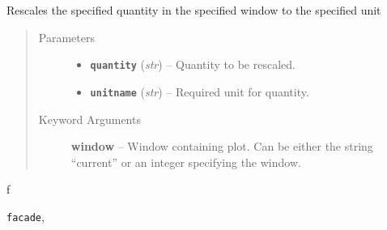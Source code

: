 \documentclass[letterpaper,10pt,english]{sphinxmanual}
\begin{document}

\begin{fulllineitems}
\label{index:facade.rescale}
Rescales the specified quantity in the specified window to the specified unit
\begin{quote}\begin{description}
\item[{Parameters}] \leavevmode\begin{itemize}
\item {} 
\textbf{\texttt{quantity}} (\emph{str}) -- Quantity to be rescaled.

\item {} 
\textbf{\texttt{unitname}} (\emph{str}) -- Required unit for quantity.

\end{itemize}

\item[{Keyword Arguments}] \leavevmode
\textbf{window} --
Window containing plot. Can be either the string ``current'' or
an integer specifying the window.

\end{description}\end{quote}

\end{fulllineitems}



\renewcommand{\indexname}{Python Module Index}
\begin{theindex}
\def\bigletter#1{{\Large\sffamily#1}\nopagebreak\vspace{1mm}}
\bigletter{f}
\item {\texttt{facade}}, \pageref{index:module-facade}
\end{theindex}

\renewcommand{\indexname}{Index}
\printindex
\end{document}
